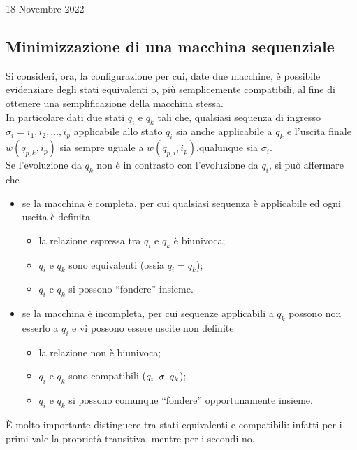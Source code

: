 \documentclass[a4paper]{extarticle}
\newcommand{\quotes}[1]{``#1''}
\begin{document}
\newpage
\begin{center}
    18 Novembre 2022
\end{center}
\subsection{Minimizzazione di una macchina sequenziale}
Si consideri, ora, la configurazione per cui, date due macchine, è possibile evidenziare degli stati equivalenti o, più semplicemente compatibili, al fine di ottenere una semplificazione della macchina stessa.\\
In particolare dati due stati $q_i$ e $q_k$ tali che, qualsiasi sequenza di ingresso $\sigma_i = i_1, i_2,\dots,i_p$ applicabile allo stato $q_i$ sia anche applicabile a $q_k$ e l'uscita finale $w(q_{p,k},i_p)$ sia sempre uguale a $w(q_{p,i},i_p)$,qualunque sia $\sigma_i$.\\
Se l'evoluzione da $q_k$ non è in contrasto con l'evoluzione da $q_i$, si può affermare che
\begin{itemize}
    \item se la macchina è completa, per cui qualsiasi sequenza è applicabile ed ogni uscita è definita
    \begin{itemize}
        \item la relazione espressa tra $q_i$ e $q_k$ è biunivoca;
        \item $q_i$ e $q_k$ sono equivalenti (ossia $q_i = q_k$);
        \item $q_i$ e $q_k$ si possono \quotes{fondere} insieme.
    \end{itemize}
    \item se la macchina è incompleta, per cui sequenze applicabili a $q_k$ possono non esserlo a $q_i$ e vi possono essere uscite non definite
    \begin{itemize}
        \item la relazione non è biunivoca;
        \item $q_i$ e $q_k$ sono compatibili ($q_i \hspace{0.5em} \sigma \hspace{0.5em} q_k$);
        \item $q_i$ e $q_k$ si possono comunque \quotes{fondere} opportunamente insieme.
    \end{itemize}
\end{itemize}
È molto importante distinguere tra stati equivalenti e compatibili: infatti per i primi vale la proprietà transitiva, mentre per i secondi no.
\end{document}
